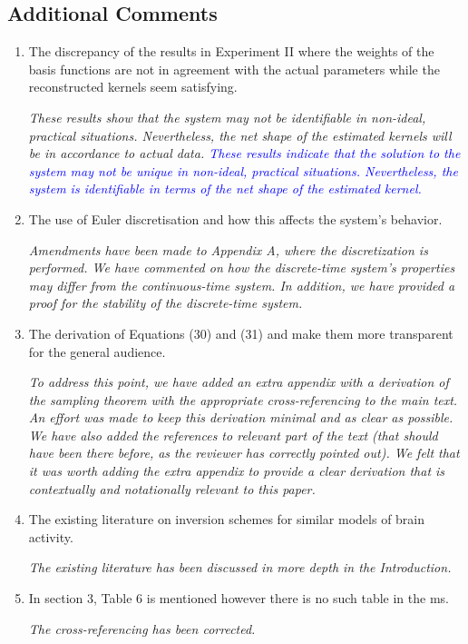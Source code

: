 \documentclass{article}
\newcommand{\parham}[1]{\textcolor{blue}{#1}}
\begin{document}
    \subsection{Additional Comments}
    
    \begin{enumerate}
        \item The discrepancy of the results in Experiment II where the weights of the basis functions are not in agreement with the actual parameters while the reconstructed kernels seem satisfying.

		\emph{These results show that the system may not be identifiable in non-ideal, practical situations. Nevertheless, the net shape of the estimated kernels will be in accordance to actual data. \parham{These results indicate that the solution to the system may not be unique in non-ideal, practical situations. Nevertheless, the system is identifiable in terms of the net shape of the estimated kernel.}}

        \item The use of Euler discretisation and how this affects the system's behavior.

		\emph{Amendments have been made to Appendix A, where the discretization is performed. We have commented on how the discrete-time system's properties may differ from the continuous-time system. In addition, we have provided a proof for the stability of the discrete-time system.}
		
        \item The derivation of Equations (30) and (31) and make them more transparent for the general audience.

\emph{To address this point, we have added an extra appendix with a derivation of the sampling theorem with the appropriate cross-referencing to the main text. An effort was made to keep this derivation minimal and as clear as possible. We have also added the references to relevant part of the text (that should have been there before, as the reviewer has correctly pointed out). We felt that it was worth adding the extra appendix to provide a clear derivation that is contextually and notationally relevant to this paper.}

        \item The existing literature on inversion schemes for similar models of brain activity.

\emph{The existing literature has been discussed in more depth in the Introduction.}

        \item In section 3, Table 6 is mentioned however there is no such table in the ms.

\emph{The cross-referencing has been corrected.}

    \end{enumerate}
    
\end{document}
